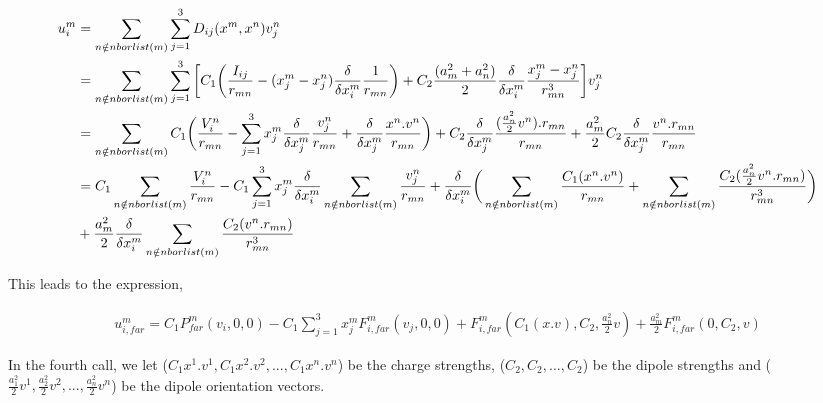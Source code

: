 \documentclass[a4paper,9pt]{report}
\begin{document}
\begin{equation} \label{eq3}
\begin{split}
u^{m}_{i} & = \sum_{n\notin nborlist(m)} \sum\limits_{j=1}^3 D_{ij}(x^{m}, x^{n})v^{n}_{j} \\
&= \sum_{n\notin nborlist(m)} \sum\limits_{j=1}^3 \bigg[C_{1}\bigg(\frac{I_{ij}}{r_{mn}} - (x_{j}^{m} - x_{j}^{n})\frac{\delta}{\delta x_{i}^{m}}\frac{1}{r_{mn}} \bigg) + C_{2}\frac{(a_{m}^{2} + a_{n}^{2})}{2}\frac{\delta}{\delta x_{i}^{m}}\frac{x_{j}^{m} - x_{j}^{n}}{r_{mn}^{3}} \bigg]v_{j}^{n} \\
 & = \sum_{n\notin nborlist(m)} C_{1}\bigg(\frac{V_{i}^{n}}{r_{mn}} - \sum\limits_{j=1}^3 x_{j}^{m} \frac{\delta}{\delta x_{j}^{m}}\frac{v_{j}^{n}}{r_{mn}} +  \frac{\delta}{\delta x_{j}^{m}}\frac{x^{n}.v^{n}}{r_{mn}} \bigg) + C_{2}\frac{\delta}{\delta x_{j}^{m}}\frac{(\frac{a_{n}^{2}}{2}v^{n}).r_{mn}}{r_{mn}} + \frac{a_{m}^{2}}{2}C_{2}\frac{\delta}{\delta x_{j}^{m}}\frac{v^{n}.r_{mn}}{r_{mn}} \\
 & = C_{1}\sum_{n\notin nborlist(m)}\frac{V_{i}^{n}}{r_{mn}} - C_{1}\sum\limits_{j=1}^3 x_{j}^{m}\frac{\delta}{\delta x_{i}^{m}}  \sum_{n\notin nborlist(m)}\frac{v_{j}^{n}}{r_{mn}} + \frac{\delta}{\delta x_{i}^{m}}\bigg(\sum_{n\notin nborlist(m)}\frac{C_{1}(x^{n}.v^{n})}{r_{mn}} + \sum_{n\notin nborlist(m)}\frac{C_{2}(\frac{a_{n}^{2}}{2}v^{n}.r_{mn})}{r_{mn}^{3}}\bigg)\\
\hskip 0.1cm  &  +  \frac{a_{m}^{2}}{2}\frac{\delta}{\delta x_{i}^{m}}\sum_{n\notin nborlist(m)}\frac{C_{2}(v^{n}.r_{mn})}{r_{mn}^{3}}
\end{split}
\end{equation}
 
 
\vskip 0.1cm 
 This leads to the expression, 

\begin{equation} \label{eq4}
\begin{split}
u^{m}_{i,far} = C_{1}P^{m}_{far}(v_{i}, 0, 0) - 
				  C_{1}\sum\limits_{j=1}^3 x_{j}^{m}F_{i,far}^{m}(v_{j}, 0, 0) +
                  F_{i,far}^{m}(C_{1}(x.v), C_{2}, \frac{a_{n}^{2}}{2}v) + 
            \frac{a_{m}^{2}}{2} F_{i,far}^{m}(0, C_{2}, v)
\end{split}
\end{equation}

 \vskip 1cm

 In the fourth call, we let ($C_{1}x^{1}.v^{1}, C_{1}x^{2}.v^{2},...,C_{1}x^{n}.v^{n}$) be the charge strengths, ($C_{2},C_{2},...,C_{2}$) be the dipole strengths and ($\frac{a_{1}^{2}}{2}v^{1}, \frac{a_{2}^{2}}{2}v^{2},...,\frac{a_{n}^{2}}{2}v^{n}$) be the dipole orientation vectors.   
 
\end{document}
